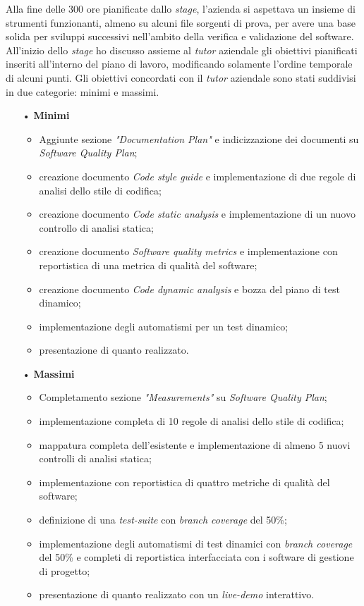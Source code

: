 Alla fine delle 300 ore pianificate dallo \textit{stage}, l'azienda si aspettava un insieme di strumenti funzionanti, almeno su alcuni file sorgenti di prova, per avere una base solida per sviluppi successivi nell'ambito della verifica e validazione del software.
All'inizio dello \textit{stage} ho discusso assieme al \textit{tutor} aziendale gli obiettivi pianificati inseriti all'interno del piano di lavoro, modificando solamente l'ordine temporale di alcuni punti. Gli obiettivi concordati con il \textit{tutor} aziendale sono stati suddivisi in due categorie: minimi e massimi.
\begin{itemize}
\item[•] \textbf{Minimi}
	\begin{itemize}
	\item Aggiunte sezione \textit{"Documentation Plan"} e indicizzazione dei documenti su \textit{Software Quality Plan};
	\item creazione documento \textit{Code style guide} e implementazione di due regole di analisi dello stile di codifica;
	\item creazione documento \textit{Code static analysis} e implementazione di un nuovo controllo di analisi statica;
	\item creazione documento \textit{Software quality metrics} e implementazione con reportistica di una metrica di qualità del software;
	\item creazione documento \textit{Code dynamic analysis} e bozza del piano di test dinamico;
	\item implementazione degli automatismi per un test dinamico;
	\item presentazione di quanto realizzato.
	\end{itemize}
	
\item[•] \textbf{Massimi}
	\begin{itemize}
	\item Completamento sezione \textit{"Measurements"} su \textit{Software Quality Plan};
	\item implementazione completa di 10 regole di analisi dello stile di codifica;
	\item mappatura completa dell'esistente e implementazione di almeno 5 nuovi controlli di analisi statica;
	\item implementazione con reportistica di quattro metriche di qualità del software;
	\item definizione di una \textit{test-suite} con \textit{branch coverage} del 50\%;
	\item implementazione degli automatismi di test dinamici con \textit{branch coverage} del 50\% e completi di reportistica interfacciata con i software di gestione di progetto;
	\item presentazione di quanto realizzato con un \textit{live-demo} interattivo.
	\end{itemize}
\end{itemize}



